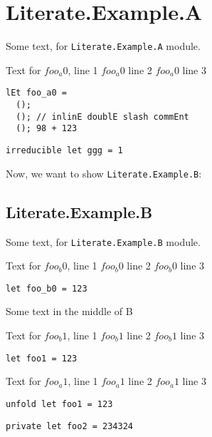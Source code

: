 \documentclass{article}
\begin{document}
\section{Literate.Example.A}

Some text, for \texttt{Literate.Example.A} module.

Text for $foo_a0$, line 1
$foo_a0$ line 2
$foo_a0$ line 3

\begin{verbatim}
lEt foo_a0 = 
  ();
  (); // inlinE doublE slash commEnt
  (); 98 + 123
\end{verbatim}

\begin{verbatim}
irreducible let ggg = 1
\end{verbatim}

Now, we want to show \texttt{Literate.Example.B}:

\subsection{Literate.Example.B}
Some text, for \texttt{Literate.Example.B} module.

Text for $foo_b0$, line 1
$foo_b0$ line 2
$foo_b0$ line 3

\begin{verbatim}
let foo_b0 = 123
\end{verbatim}

Some text in the middle of B

Text for $foo_b1$, line 1
$foo_b1$ line 2
$foo_b1$ line 3

\begin{verbatim}
let foo1 = 123
\end{verbatim}

Text for $foo_a1$, line 1
$foo_a1$ line 2
$foo_a1$ line 3

\begin{verbatim}
unfold let foo1 = 123
\end{verbatim}

\begin{verbatim}
private let foo2 = 234324
\end{verbatim}
\end{document}
